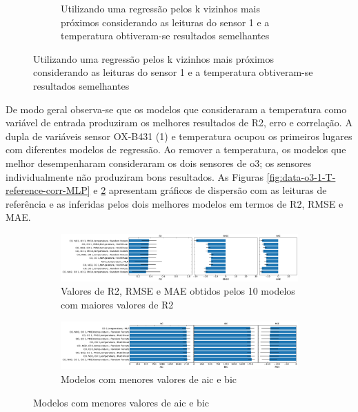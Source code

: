 \begin{figure}[h!]
\begin{subfigure}{0.49\textwidth}
        \caption{Utilizando uma regressão pelos k vizinhos mais próximos considerando as leituras do sensor 1 e a temperatura obtiveram-se resultados semelhantes}
        \label{fig:data-o3-1-2-T-reference-corr-MLR}
    \end{subfigure}
\end{figure}

De modo geral observa-se que os modelos que consideraram a temperatura como variável de entrada produziram os melhores resultados de R2, erro e correlação. A dupla de variáveis sensor OX-B431 (1) e temperatura ocupou os primeiros lugares com diferentes modelos de regressão. Ao remover a temperatura, os modelos que melhor desempenharam consideraram os dois sensores de \acrshort{o3}; os sensores individualmente não produziram bons resultados. As Figuras \ref{fig:data-o3-1-T-reference-corr-MLP} e \ref{fig:data-o3-1-2-T-reference-corr-MLR} apresentam gráficos de dispersão com as leituras de referência e as inferidas pelos dois melhores modelos em termos de R2, RMSE e MAE.

\begin{figure}[h!]
    \centering
    \caption{Desempenho dos modelos de regressão aplicados para inferir as leituras de concentração de \acrshort{o3} medidas pela estação de referência}
    \begin{subfigure}{0.9\textwidth}
        \includegraphics[width=\textwidth]{chapters/4-CALIBRAÇÃO MÚLTIPLOS SENSORES/Figuras/o3-all-models-performance.png}
        \caption{Valores de R2, RMSE e MAE obtidos pelos 10 modelos com maiores valores de R2}
        \label{fig:data-o3-all-models-performance}
    \end{subfigure}
    \begin{subfigure}{0.9\textwidth}
        \includegraphics[width=\textwidth]{chapters/4-CALIBRAÇÃO MÚLTIPLOS SENSORES/Figuras/o3-all-models-complexity.png}
        \caption{Modelos com menores valores de \acrshort{aic} e \acrshort{bic}}
        \label{fig:data-o3-all-models-comlexity}
    \end{subfigure}
    \label{fig:data-o3-all-models-performance-comlexity}
\end{figure}

